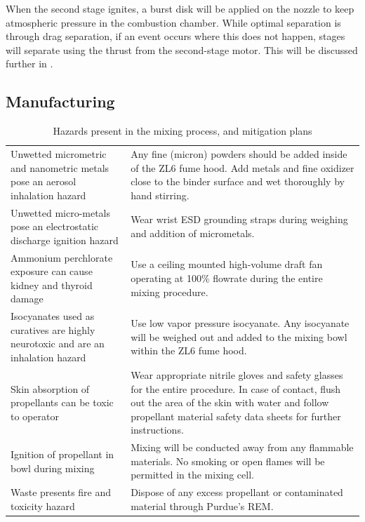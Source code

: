 When the second stage ignites, a burst disk will be applied on the nozzle to keep atmospheric pressure in the combustion chamber. While optimal separation is through drag separation, if an event occurs where this does not happen, stages will separate using the thrust from the second-stage motor. This will be discussed further in .


\subsection{Manufacturing}

\begin{table}
    \centering

    \begin{longtable}{|>{\raggedright\arraybackslash}p{5.75cm}|>{\raggedright\arraybackslash}p{8.75cm}|}
        \hline
        \multicolumn{1}{|c|}{\textbf{Hazard}} & \multicolumn{1}{c|}{\textbf{Mitigation}} \\ \hline
        Unwetted micrometric and nanometric metals pose an aerosol inhalation hazard & Any fine (micron) powders should be added inside of the ZL6 fume hood. Add metals and fine oxidizer close to the binder surface and wet thoroughly by hand stirring. \\ \hline
        Unwetted micro-metals pose an electrostatic discharge ignition hazard & Wear wrist ESD grounding straps during weighing and addition of micrometals. \\ \hline
        Ammonium perchlorate exposure can cause kidney and thyroid damage & Use a ceiling mounted high-volume draft fan operating at 100\% flowrate during the entire mixing procedure. \\ \hline
        Isocyanates used as curatives are highly neurotoxic and are an inhalation hazard & Use low vapor pressure isocyanate. Any isocyanate will be weighed out and added to the mixing bowl within the ZL6 fume hood. \\ \hline
        Skin absorption of propellants can be toxic to operator & Wear appropriate nitrile gloves and safety glasses for the entire procedure. In case of contact, flush out the area of the skin with water and follow propellant material safety data sheets for further instructions. \\ \hline
        Ignition of propellant in bowl during mixing & Mixing will be conducted away from any flammable materials. No smoking or open flames will be permitted in the mixing cell. \\ \hline
        Waste presents fire and toxicity hazard & Dispose of any excess propellant or contaminated material through Purdue's REM. \\ \hline
    \end{longtable}

    \vspace{0.2cm}
    
    \caption{Hazards present in the mixing process, and mitigation plans}
    \label{table:prop-hazards}
\end{table}

